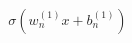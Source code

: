 \documentclass[preview]{standalone}
\begin{document}
\begin{align*}
\sigma(w_n^{(1)}x+b_n^{(1)})
\end{align*}
\end{document}

